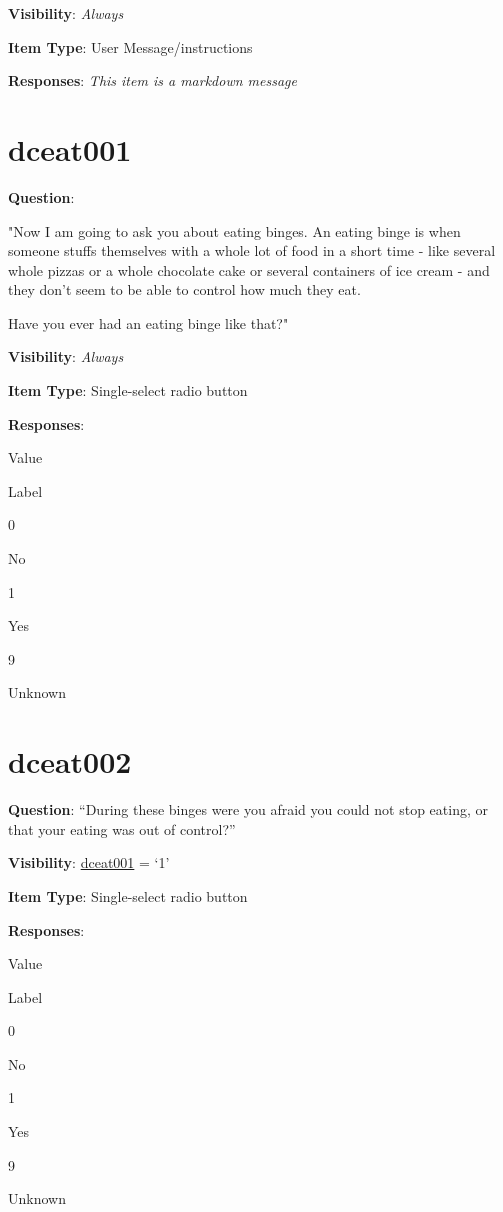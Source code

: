 \documentclass[]{book}
\begin{document}
\textbf{Visibility}: \emph{Always}

\textbf{Item Type}: User Message/instructions

\textbf{Responses}: \emph{This item is a markdown message}

\hypertarget{dceat001}{%
\section{dceat001}\label{dceat001}}

\textbf{Question}:

"Now I am going to ask you about eating binges. An eating binge is when someone stuffs themselves with a whole lot of food in a short time - like several whole pizzas or a whole chocolate cake or several containers of ice cream - and they don't seem to be able to control how much they eat.

Have you ever had an eating binge like that?"

\textbf{Visibility}: \emph{Always}

\textbf{Item Type}: Single-select radio button

\textbf{Responses}:

Value

Label

0

No

1

Yes

9

Unknown

\hypertarget{dceat002}{%
\section{dceat002}\label{dceat002}}

\textbf{Question}: ``During these binges were you afraid you could not stop eating, or that your eating was out of control?''

\textbf{Visibility}: \protect\hyperlink{dceat001}{dceat001} = `1'

\textbf{Item Type}: Single-select radio button

\textbf{Responses}:

Value

Label

0

No

1

Yes

9

Unknown
\end{document}
